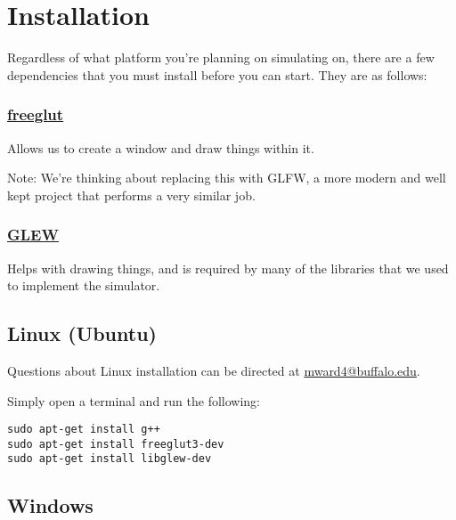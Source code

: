 \documentclass[12pt]{article}
\begin{document}

\section{Installation}

Regardless of what platform you're planning on simulating on, there are a few
dependencies that you must install before you can start. They are as follows:

\subsubsection{\href{http://freeglut.sourceforge.net/}{freeglut}}

Allows us to create a window and draw things within it.

Note: We're thinking about replacing this with GLFW, a more modern and well kept
project that performs a very similar job.


\subsubsection{\href{http://glew.sourceforge.net/}{GLEW}}

Helps with drawing things, and is required by many of the libraries that
we used to implement the simulator.


\subsection{Linux (Ubuntu)}

Questions about Linux installation can be directed at \url{mward4@buffalo.edu}.

Simply open a terminal and run the following:

\begin{lstlisting}
sudo apt-get install g++
sudo apt-get install freeglut3-dev
sudo apt-get install libglew-dev
\end{lstlisting}

\subsection{Windows}
\end{document}
